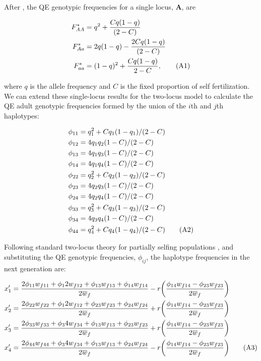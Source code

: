 \documentclass{article}
\newcommand\numberthis{\addtocounter{equation}{1}\tag{\theequation}}
\begin{document}
After \citet{CaballeroHill1992}, the QE genotypic frequencies for a single locus, $\mathbf{A}$, are

\begin{align*}
	F_{AA}^* &= q^2 + \frac{C q(1 - q)}{(2 - C)} \\
	F_{Aa}^* &= 2 q (1 - q) - \frac{2 C q(1 - q)}{(2 - C)} \\
	F_{aa}^* &= (1 - q)^2 + \frac{C q(1 - q)}{2 - C}, \numberthis 
\end{align*}

\noindent{} where $q$ is the allele frequency and $C$ is the fixed proportion of self fertilization. We can extend these single-locus results for the two-locus model to calculate the QE adult genotypic frequencies formed by the union of the $i$th and $j$th haplotypes:

\begin{align*}
	\phi_{11} &= q_1^2 + C q_1 (1 - q_1) / (2-C)  \\
	\phi_{12} &= 4 q_1 q_2 (1 - C) / (2-C)        \\
	\phi_{13} &= 4 q_1 q_3 (1 - C) / (2-C)        \\
	\phi_{14} &= 4 q_1 q_4 (1 - C) / (2-C)        \\
	\phi_{22} &= q_2^2 + C q_2 (1 - q_2) / (2-C)  \\
	\phi_{23} &= 4 q_2 q_3 (1 - C) / (2-C)        \\
	\phi_{24} &= 4 q_2 q_4 (1 - C) / (2-C)        \\
	\phi_{33} &= q_3^2 + C q_3 (1 - q_3) / (2-C)  \\
	\phi_{34} &= 4 q_3 q_4 (1 - C) / (2-C)        \\
	\phi_{44} &= q_4^2 + C q_4 (1 - q_4) / (2-C)  \numberthis
\end{align*}


Following standard two-locus theory for partially selfing populations \citep{Holden1979, OttoDay2007, JordanConnallon2014}, and substituting the QE genotypic frequencies, $\phi_{ij}$, the haplotype frequencies in the next generation are:

\begin{align*}
	x'_1 &= \frac{2 \phi_{11} w_{f11} + \phi_12 w_{f12} + \phi_{13} w_{f13} + \phi_{14} w_{f14}}{2 \overline{w}_f} -
				r \bigg( \frac{\phi_{14} w_{f14} - \phi_{23} w_{f23}} {2 \overline{w}_f} \bigg) \\
	x'_2 &= \frac{2 \phi_{22} w_{f22} + \phi_12 w_{f12} + \phi_{23} w_{f23} + \phi_{24} w_{f24}}{2 \overline{w}_f} +
				r \bigg( \frac{\phi_{14} w_{f14} - \phi_{23} w_{f23}} {2 \overline{w}_f} \bigg) \\ 
	x'_3 &= \frac{2 \phi_{33} w_{f33} + \phi_34 w_{f34} + \phi_{13} w_{f13} + \phi_{23} w_{f23}}{2 \overline{w}_f} +
				r \bigg( \frac{\phi_{14} w_{f14} - \phi_{23} w_{f23}} {2 \overline{w}_f} \bigg) \\
	x'_4 &= \frac{2 \phi_{44} w_{f44} + \phi_34 w_{f34} + \phi_{13} w_{f13} + \phi_{24} w_{f24}}{2 \overline{w}_f} -
				r \bigg( \frac{\phi_{14} w_{f14} - \phi_{23} w_{f23}} {2 \overline{w}_f} \bigg) \numberthis
\end{align*}
\end{document}
